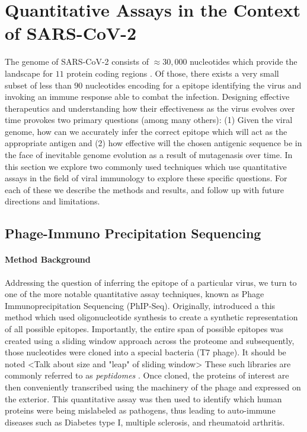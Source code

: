 \documentclass{article}
\begin{document}
\section*{Quantitative Assays in the Context of SARS-CoV-2}

The genome of SARS-CoV-2 consists of $\approx 30,000$ nucleotides which provide the landscape for $11$ protein coding regions \citep{Naqvi2020}.
Of those, there exists a very small subset of less than $90$ nucleotides encoding for a epitope identifying the virus and invoking an immune response able to combat the infection.
Designing effective therapeutics and understanding how their effectiveness as the virus evolves over time provokes two primary questions (among many others):
(1) Given the viral genome, how can we accurately infer the correct epitope which will act as the appropriate antigen and 
(2) how effective will the chosen antigenic sequence be in the face of inevitable genome evolution as a result of mutagenasis over time.
In this section we explore two commonly used techniques which use quantitative assays in the field of viral immunology to explore these specific questions. 
For each of these we describe the methods and results, and follow up with future directions and limitations.

\subsection*{Phage-Immuno Precipitation Sequencing}

\paragraph{Method Background}
Addressing the question of inferring the epitope of a particular virus, we turn to one of the more notable quantitative assay techniques, known as Phage Immunoprecipitation Sequencing (PhIP-Seq).
Originally, \citet{Larman2011} introduced a this method which used oligonucleotide synthesis to create a synthetic representation of all possible epitopes.
Importantly, the entire span of possible epitopes was created using a sliding window approach across the proteome and subsequently, those nucleotides were cloned into a special bacteria (T7 phage).
It should be noted <Talk about size and "leap" of sliding window>
These such libraries are commonly referred to as \textit{peptidomes} \citep{Mohan2018}.
Once cloned, the proteins of interest are then conveniently transcribed using the machinery of the phage and expressed on the exterior.
This quantitative assay was then used to identify which human proteins were being mislabeled as pathogens, thus leading to auto-immune diseases such as Diabetes type I, multiple sclerosis, and rheumatoid arthritis.
\end{document}
